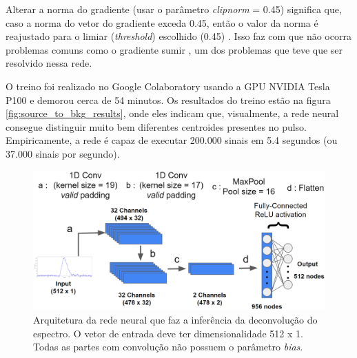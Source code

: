 \documentclass[a4paper,12pt,oneside]{book}
\begin{document}
\par Alterar a norma do gradiente (usar o parâmetro \textit{clipnorm} = 0.45) significa que, caso a norma do vetor do gradiente exceda 0.45, então o valor da norma é reajustado para o limiar (\textit{threshold}) escolhido (0.45) \cite{FORTINO2022166497}. Isso faz com que não ocorra problemas comuns como o gradiente sumir \cite{VGP, ADAMAX}, um dos problemas que teve que ser resolvido nessa rede.

\par O treino foi realizado no Google Colaboratory \cite{google_colab} usando a GPU NVIDIA Tesla P100 e demorou cerca de 54 minutos. Os resultados do treino estão na figura \ref{fig:source_to_bkg_results}, onde eles indicam que, visualmente, a rede neural consegue distinguir muito bem diferentes centroides presentes no pulso. Empiricamente, a rede é capaz de executar 200.000 sinais em 5.4 segundos (ou 37.000 sinais por segundo).

\begin{figure}[H]
    \centering
    \includegraphics[scale = 0.28]{figs/source_wobkg_to_deconv.png}
    \caption{Arquitetura da rede neural que faz a inferência da deconvolução do espectro. O vetor de entrada deve ter dimensionalidade 512 x 1. Todas as partes com convolução não possuem o parâmetro \textit{bias}.}
    \label{fig:source_to_deconv}
\end{figure}
\end{document}
